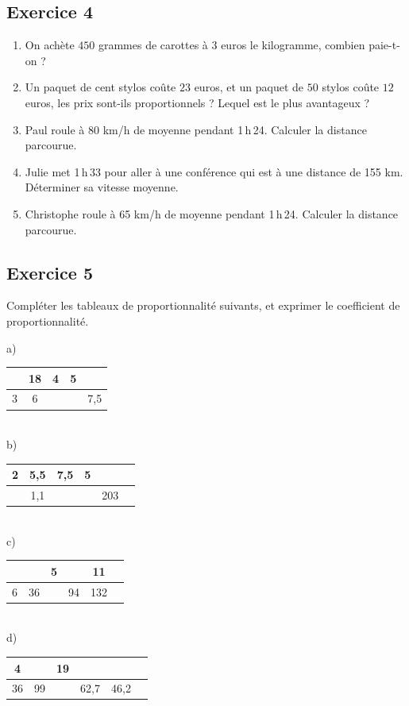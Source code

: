 \documentclass[12 pt]{extarticle}
\theoremstyle{plain}
\begin{document}
\subsection*{Exercice 4}
\begin{enumerate}
\item On achète $450$ grammes de carottes à $3$ euros le kilogramme, combien paie-t-on ? 

\item Un paquet de cent stylos coûte $23$ euros, et un paquet de $50$ 
stylos coûte $12$ euros, les prix sont-ils proportionnels ? Lequel est le plus avantageux ?
	\item Paul roule à 80 km/h de moyenne pendant 1\,h\,24. Calculer la distance parcourue.
	\item Julie met 1\,h\,33 pour aller à une conférence qui est à une distance de 155 km. Déterminer sa vitesse moyenne.
	\item Christophe roule à 65 km/h de moyenne pendant 1\,h\,24. Calculer la distance parcourue.
\end{enumerate}  


 \subsection*{Exercice 5}

Compléter les tableaux de proportionnalité suivants, et exprimer le coefficient de proportionnalité. 

a) \begin{tabular}{ | c |c | c| c|c| }\hline
 & 18  & 4 & 5 & \\
 \hline
 3 & 6 &  &  & 7,5 \\ \hline
\end{tabular} 

 \ \\ 
 
b) \begin{tabular}{|c | c | c | c | c | c}
\hline
2 & 5,5  & 7,5 &  5 &  \\
\hline
 & 1,1 & & &203 \\ \hline

\end{tabular}

 \ \\ 
 
 
c) \begin{tabular}{|c | c | c | c | c | c}
\hline
&  & 5 &   & 11      \\
\hline
6& 36 &  & 94  & 132  \\ \hline

\end{tabular}

 \ \\ 
 
d) \begin{tabular}{|c | c | c | c | c | c}
\hline
4 &  & 19 &   &  \\
\hline
36& 99 &  & 62,7 & 46,2 \\ \hline

\end{tabular}



 	
\end{document}
